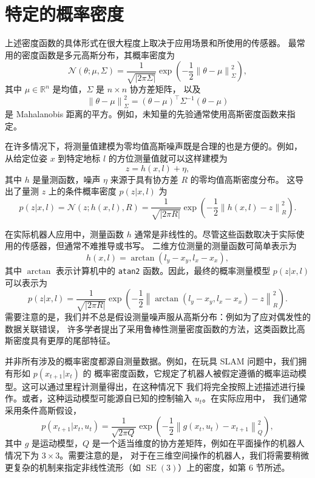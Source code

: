 \documentclass[fontset=none]{Notes}
\DeclareMathOperator\SE{SE}
\newcommand{\norm}[1]{\left\lVert#1\right\rVert}
\begin{document}
\section{特定的概率密度}

上述密度函数的具体形式在很大程度上取决于应用场景和所使用的传感器。
最常用的密度函数是多元高斯分布，其概率密度为
\[
  \mathcal{N}(\theta;\mu,\Sigma)=\frac{1}{\sqrt{|2\pi\Sigma|}}
  \exp\left(-\frac{1}{2}\norm{\theta-\mu}_{\Sigma}^2\right),
\]
其中 $\mu\in \mathbb{R}^n$ 是均值，$\Sigma$ 是 $n\times n$ 协方差矩阵，
以及
\[
  \norm{\theta-\mu}_{\Sigma}^2=(\theta-\mu)^\top\Sigma^{-1}(\theta-\mu)
\]
是 Mahalanobis 距离的平方。例如，未知量的先验通常使用高斯密度函数来指定。

在许多情况下，将测量值建模为零均值高斯噪声既是合理的也是方便的。例如，
从给定位姿 $x$ 到特定地标 $l$ 的方位测量值就可以这样建模为
\[
  z=h(x,l)+\eta,
\]
其中 $h$ 是量测函数，噪声 $\eta$ 来源于具有协方差 $R$ 的零均值高斯密度分布。
这导出了量测 $z$ 上的条件概率密度 $p(z|x,l)$ 为
\[
  p(z|x,l)=\mathcal N(z;h(x,l),R)=\frac{1}{\sqrt{|2\pi R|}}\exp\left(
    -\frac{1}{2}\norm{h(x,l)-z}_R^2
  \right).
\]

在实际机器人应用中，测量函数 $h$ 通常是非线性的。尽管这些函数取决于实际使用的传感器，但通常不难推导或书写。
二维方位测量的测量函数可简单表示为
\[
  h(x,l)=\arctan(l_y-x_y,l_x-x_x),
\]
其中 $\arctan$ 表示计算机中的 \texttt{atan2} 函数。因此，最终的概率测量模型
$p(z|x,l)$ 可以表示为
\begin{equation}\label{eq:pzxl}
  p(z|x,l)=\frac{1}{\sqrt{|2\pi R|}}\exp\left(
    -\frac{1}{2}\norm{\arctan(l_y-x_y,l_x-x_x)-z}_R^2
  \right).
\end{equation}
需要注意的是，我们并不总是假设测量噪声服从高斯分布：例如为了应对偶发性的数据关联错误，
许多学者提出了采用鲁棒性测量密度函数的方法，这类函数比高斯密度具有更厚的尾部特征。

并非所有涉及的概率密度都源自测量数据。例如，在玩具 SLAM 问题中，我们拥有形如 $p(x_{t+1}|x_t)$ 的
概率密度函数，它规定了机器人被假定遵循的概率运动模型。这可以通过里程计测量得出，在这种情况下
我们将完全按照上述描述进行操作。或者，这种运动模型可能源自已知的控制输入 $u_t$。在实际应用中，
我们通常采用条件高斯假设，
\[
  p(x_{t+1}|x_t,u_t)=\frac{1}{\sqrt{2\pi Q}}\exp\left(
    -\frac{1}{2}\norm{g(x_t,u_t)-x_{t+1}}_Q^2
  \right),
\]
其中 $g$ 是运动模型，$Q$ 是一个适当维度的协方差矩阵，例如在平面操作的机器人情况下为 $3×3$。需要注意的是，
对于在三维空间操作的机器人，我们将需要稍微更复杂的机制来指定非线性流形（如 $\SE(3)$）上的密度，如第 6 节所述。
\end{document}
